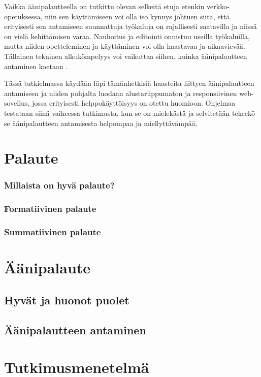 \documentclass[utf8]{gradu3}
\begin{document}
Vaikka äänipalautteella on tutkittu olevan selkeitä etuja etenkin verkko-opetuksessa, niin sen käyttämiseen voi olla iso kynnys johtuen siitä, että erityisesti sen antamiseen suunnattuja työkaluja on rajallisesti saatavilla ja niissä on vielä kehittämisen varaa. Nauhoitus ja editointi onnistuu useilla työkaluilla, mutta niiden opetteleminen ja käyttäminen voi olla haastavaa ja aikaavievää. Tällainen tekninen alkukömpelyys voi vaikuttaa siihen, kuinka äänipalautteen antaminen koetaan \parencite[][]{cavanaugh2014}.

Tässä tutkielmassa käydään läpi tämänhetkisiä haasteita liittyen äänipalautteen antamiseen ja niiden pohjalta luodaan alustariippumaton ja responsiivinen web-sovellus, jossa erityisesti helppokäyttöisyys on otettu huomioon. Ohjelmaa testataan siinä vaiheessa tutkimusta, kun se on mielekästä ja selvitetään tekeekö se äänipalautteen antamisesta helpompaa ja miellyttävämpää.

\chapter{Palaute}
\subsection{Millaista on hyvä palaute?}
\subsection{Formatiivinen palaute}
\subsection{Summatiivinen palaute}

%

\chapter{Äänipalaute}

\section{Hyvät ja huonot puolet}

\section{Äänipalautteen antaminen}


%

\chapter{Tutkimusmenetelmä}
\end{document}
